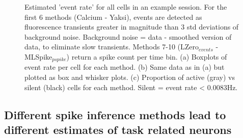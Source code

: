 \documentclass[a4paper]{article}
\begin{document}
\begin{figure}%
\centering
{}
\caption{\label{fig:event_detection} Estimated 'event rate' for all cells in an example session. For the first 6 methods (Calcium - Yaksi), events are detected as fluorescence transients greater in magnitude than 3 std deviations of background noise. Background noise = data - smoothed version of data, to eliminate slow transients. Methods 7-10 (LZero$_{events}$ - MLSpike$_{pspike}$) return a spike count per time bin. (a) Boxplots of event rate per cell for each method. (b) Same data as in (a) but plotted as box and whisker plots. (c) Proportion of active (gray) vs silent (black) cells for each method. Silent = event rate < 0.0083Hz.}
\end{figure}

\clearpage
\subsection{Different spike inference methods lead to different estimates of task related neurons}
\end{document}
